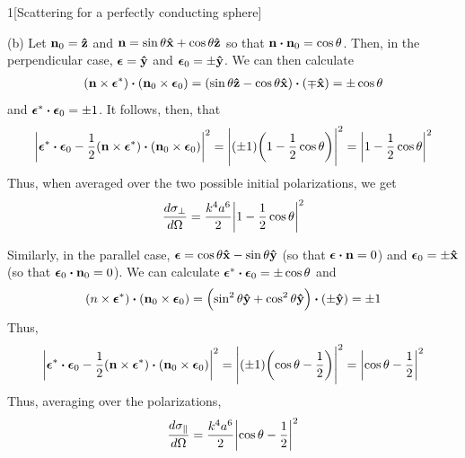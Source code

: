 \documentclass[12pt]{article}
\begin{document}
\begin{problem}{1}[Scattering for a perfectly conducting sphere]
\begin{solution}
(b) Let $\vb{n}_0=\vb{\hat{z}}$ and $\vb{n}=\sin\theta\vb{\hat{x}}+\cos\theta\vb{\hat{z}}$ so that
$\vb{n}\vdot\vb{n}_0=\cos\theta$. Then, in the perpendicular case,
$\bm\epsilon=\vb{\hat{y}}$ and $\bm\epsilon_0=\pm\vb{\hat{y}}$. We can then calculate
\begin{align}
    \qty(\vb{n}\times\bm\epsilon^\ast)\vdot\qty(\vb{n}_0\times\bm\epsilon_0)
    =\qty(\sin\theta\zhat-\cos\theta\xhat)\vdot\qty(\mp\xhat)
    =\pm\cos\theta 
\end{align}
and $\bm\epsilon^\ast\vdot\bm\epsilon_0=\pm 1$. It follows, then, that
\begin{equation}
    \abs{\bm\epsilon^\ast\vdot\bm\epsilon_0-\frac12\qty(\vb{n}\times\bm\epsilon^\ast)\vdot\qty(\vb{n}_0\times\bm\epsilon_0)}^2=
    \abs{(\pm 1)\qty(1-\frac12\cos\theta)}^2=\abs{1-\frac12\cos\theta}^2
\end{equation}
Thus, when averaged over the two possible initial polarizations, we get
\begin{equation}
    \frac{d\sigma_\bot}{d\Omega}=\frac{k^4a^6}{2}\abs{1-\frac12\cos\theta}^2 
\end{equation}

Similarly, in the parallel case, $\bm\epsilon=\cos\theta\vb{\hat{x}}-\sin\theta\vb{\hat{y}}$
(so that $\bm\epsilon\vdot\vb{n}=0$) and $\bm\epsilon_0=\pm\vb{\hat{x}}$ (so that
$\bm\epsilon_0\vdot\vb{n}_0=0$). We can calculate
$\bm\epsilon^\ast\vdot\bm\epsilon_0=\pm\cos\theta$ and
\begin{equation}
    (n\times\bm\epsilon^\ast)\vdot\qty(\vb{n}_0\times\bm\epsilon_0)
    =\qty(\sin^2\theta\yhat+\cos^2\theta\yhat)\vdot\qty(\pm\yhat)
    =\pm1
\end{equation}
Thus,
\begin{equation}
    \abs{\bm\epsilon^\ast\vdot\bm\epsilon_0-\frac12\qty(\vb{n}\times\bm\epsilon^\ast)\vdot\qty(\vb{n}_0\times\bm\epsilon_0)}^2
    =\abs{(\pm1)\qty(\cos\theta-\frac12)}^2=\abs{\cos\theta-\frac12}^2
\end{equation}
Thus, averaging over the polarizations,
\begin{equation}
    \frac{d\sigma_\parallel}{d\Omega}
    =\frac{k^4a^6}{2}\abs{\cos\theta-\frac12}^2
\end{equation}


\end{solution}
\end{problem}
\end{document}
